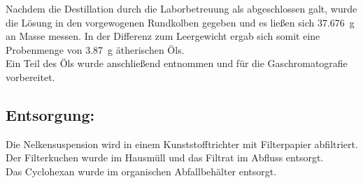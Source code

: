 Nachdem die Destillation durch die Laborbetreuung als abgeschlossen galt, wurde die Lösung in den vorgewogenen Rundkolben gegeben und es ließen sich \SI{37,676}{\gram} an Masse messen.
In der Differenz zum Leergewicht ergab sich somit eine Probenmenge von \SI{3,87}{\gram} ätherischen Öls.\\
Ein Teil des Öls wurde anschließend entnommen und für die Gaschromatografie vorbereitet.

\subsection*{Entsorgung:}
Die Nelkensuspension wird in einem Kunststofftrichter mit Filterpapier abfiltriert. Der Filterkuchen wurde im Hausmüll und das Filtrat im Abfluss entsorgt.\\
Das Cyclohexan wurde im organischen Abfallbehälter entsorgt.